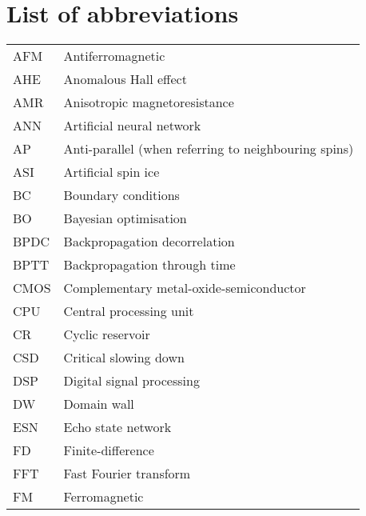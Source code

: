 \chapter{List of abbreviations}
{ %
    \addtolength{\skip\footins}{1pc}
    \begin{longtable}[l]{ll}
        AFM   & Antiferromagnetic                          \\
        AHE   & Anomalous Hall effect                       \\
        AMR   & Anisotropic magnetoresistance               \\
        ANN   & Artificial neural network                   \\
        AP    & Anti-parallel (when referring to neighbouring spins) \\
        ASI   & Artificial spin ice                         \\
        BC    & Boundary conditions                         \\
        BO    & Bayesian optimisation                       \\
        BPDC  & Backpropagation decorrelation               \\
        BPTT  & Backpropagation through time                \\
        CMOS  & Complementary metal-oxide-semiconductor     \\
        CPU   & Central processing unit                     \\
        CR    & Cyclic reservoir                            \\
        CSD   & Critical slowing down                       \\
        DSP   & Digital signal processing                   \\
        DW    & Domain wall                                 \\
        ESN   & Echo state network                          \\
        FD    & Finite-difference                           \\
        FFT   & Fast Fourier transform                      \\
        FM    & Ferromagnetic                               \\

\end{longtable}}
